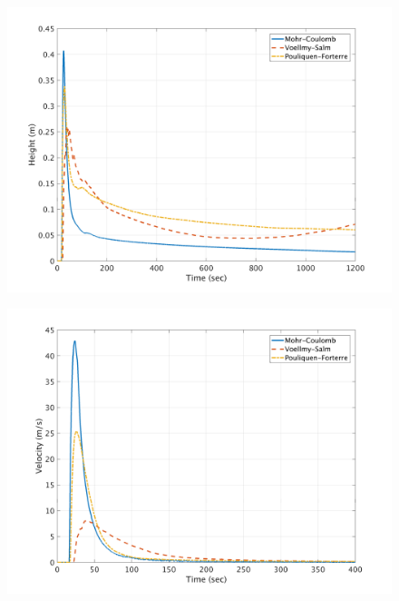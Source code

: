 \documentclass[a4paper,10pt]{article}
\begin{document}
\begin{figure}[H]
	\begin{minipage}[b]{0.5\linewidth}
	\centering
    \includegraphics[width=1\textwidth]{HeightMeans/H4All.png}     
        \label{fig:MFHR_L4}
	\end{minipage}
	\begin{minipage}[b]{0.5\linewidth}
	\centering
    \includegraphics[width=1\textwidth]{VelocityMeans/V4All.png}
        \label{fig:MFVR_L4}
	\end{minipage}
	

\end{figure}
\end{document}
